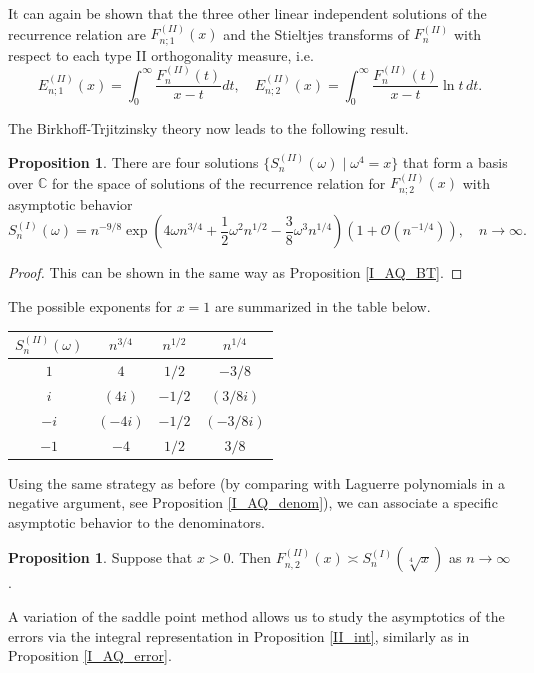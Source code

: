 \documentclass[a4paper,12pt,oneside]{article}
\theoremstyle{definition}
\newtheorem{prop}[defi]{Proposition}
\newcommand{\C}{\mathbb{C}}
\newcommand{\BO}{\mathcal{O}}
\begin{document}
It can again be shown that the three other linear independent solutions of the recurrence relation are $F_{n;1}^{(II)}(x)$ and the Stieltjes transforms of $F_n^{(II)}$ with respect to each type II orthogonality measure, i.e.
$$E_{n;1}^{(II)}(x)=\int_0^\infty \frac{F_n^{(II)}(t)}{x-t} dt ,\quad E_{n;2}^{(II)}(x)=\int_0^\infty \frac{F_n^{(II)}(t)}{x-t} \ln t \, dt.$$
\medbreak

The Birkhoff-Trjitzinsky theory now leads to the following result.

\begin{prop} \label{II_AQ_BT}
    There are four solutions $\{S_n^{(II)}(\omega)\mid \omega^4=x \}$ that form a basis over $\C$ for the space of solutions of the recurrence relation for $F_{n;2}^{(II)}(x)$ with asymptotic behavior
    $$S_{n}^{(I)}(\omega) = n^{-9/8} \exp\left(4\omega n^{3/4} + \frac{1}{2}\omega^2 n^{1/2} - \frac{3}{8}\omega^3 n^{1/4} \right) \left(1+\BO(n^{-1/4})\right),\quad n\to\infty.$$
\end{prop}
\begin{proof}
    This can be shown in the same way as Proposition \ref{I_AQ_BT}.
\end{proof}

The possible exponents for $x=1$ are summarized in the table below.
\begin{center}
\begin{tabular}{c||c|c|c}
    $S_n^{(II)}(\omega)$ & $n^{3/4}$ & $n^{1/2}$ & $n^{1/4}$ \\ \hline
    $1$ & $4$ & $1/2$ & $-3/8$ \\
    $i$ & $(4i)$ & $-1/2$ & $(3/8i)$ \\
    $-i$ & $(-4i)$ & $-1/2$ & $(-3/8i)$ \\
    $-1$ & $-4$ & $1/2$ & $3/8$ \\
\end{tabular}
\end{center}

Using the same strategy as before (by comparing with Laguerre polynomials in a negative argument, see Proposition \ref{I_AQ_denom}), we can associate a specific asymptotic behavior to the denominators.

\begin{prop}
Suppose that $x>0$. Then $F_{n,2}^{(II)}(x) \asymp S_{n}^{(I)}(\sqrt[4]{x})$ as $n\to\infty$.
\end{prop}

A variation of the saddle point method allows us to study the asymptotics of the errors via the integral representation in Proposition \ref{II_int}, similarly as in Proposition \ref{I_AQ_error}.
\end{document}
